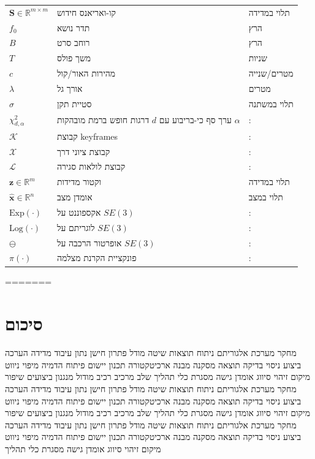 \begin{table}[htbp]
{\begin{tabular}{lll}
$\mathbf{S} \in \mathbb{R}^{m \times m}$ & קו-ואריאנס חידוש & תלוי במדידה \\
$f_0$ & תדר נושא & הרץ \\
$B$ & רוחב סרט & הרץ \\
$T$ & משך פולס & שניות \\
$c$ & מהירות האור/קול & מטרים/שנייה \\
$\lambda$ & אורך גל & מטרים \\
$\sigma$ & סטיית תקן & תלוי במשתנה \\
$\chi^2_{d, \alpha}$ & ערך סף כי-בריבוע עם $d$ דרגות חופש ברמת מובהקות $\alpha$ & : \\
$\mathcal{K}$ & קבוצת keyframes & : \\
$\mathcal{X}$ & קבוצת ציוני דרך & : \\
$\mathcal{L}$ & קבוצת לולאות סגירה & : \\
$\mathbf{z} \in \mathbb{R}^m$ & וקטור מדידות & תלוי במדידה \\
$\hat{\mathbf{x}} \in \mathbb{R}^n$ & אומדן מצב & תלוי במצב \\
$\text{Exp}(\cdot)$ & אקספוננט על $SE(3)$ & : \\
$\text{Log}(\cdot)$ & לוגריתם על $SE(3)$ & : \\
$\ominus$ & אופרטור הרכבה על $SE(3)$ & : \\
$\pi(\cdot)$ & פונקציית הקרנת מצלמה & : \\
\bottomrule
\end{tabular}%
}
\end{table}

\cite{Campos2021ORBSLAM3, Xu2022FASTLIO2, Kaess2012iSAM2, BenDavid2022Adaptive, Julier1997CovarianceIntersection, Mildenhall2020NeRF, Kerbl20233DGS, Keetha2024SplaTAM}
=======
\section{סיכום}
\label{sec:ch09}

מחקר מערכת אלגוריתם ניתוח תוצאות שיטה מודל פתרון חישן נתון עיבוד מדידה הערכה ביצוע ניסוי בדיקה תוצאה מסקנה מבנה ארכיטקטורה תכנון יישום פיתוח הדמיה מיפוי ניווט מיקום זיהוי סיווג אומדן גישה מסגרת כלי תהליך שלב מרכיב רכיב מודול מנגנון ביצועים שיפור מחקר מערכת אלגוריתם ניתוח תוצאות שיטה מודל פתרון חישן נתון עיבוד מדידה הערכה ביצוע ניסוי בדיקה תוצאה מסקנה מבנה ארכיטקטורה תכנון יישום פיתוח הדמיה מיפוי ניווט מיקום זיהוי סיווג אומדן גישה מסגרת כלי תהליך שלב מרכיב רכיב מודול מנגנון ביצועים שיפור מחקר מערכת אלגוריתם ניתוח תוצאות שיטה מודל פתרון חישן נתון עיבוד מדידה הערכה ביצוע ניסוי בדיקה תוצאה מסקנה מבנה ארכיטקטורה תכנון יישום פיתוח הדמיה מיפוי ניווט מיקום זיהוי סיווג אומדן גישה מסגרת כלי תהליך

